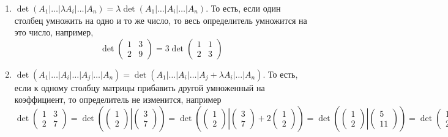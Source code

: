 \documentclass{article}
\begin{document}
\begin{enumerate}
	\item $\det(A_1|\ldots|\lambda A_i|\ldots|A_n)  = \lambda \det(A_1|\ldots|A_i|\ldots|A_n) $. То есть, если один столбец умножить на одно и то же число, то весь определитель умножится на это число, например,
	\[
	\det
	\begin{pmatrix}
		{1}&{3}\\
		{2}&{9}
	\end{pmatrix}
	=
	3
	\det
	\begin{pmatrix}
		{1}&{1}\\
		{2}&{3}
	\end{pmatrix}
	\]
	
	\item $\det(A_1|\ldots|A_i|\ldots|A_j|\ldots|A_n) = \det(A_1|\ldots|A_i|\ldots|A_j + \lambda A_i|\ldots|A_n)$. То есть, если к одному столбцу матрицы прибавить другой умноженный на коэффициент, то определитель не изменится, например
	\[
	\det
	\begin{pmatrix}
		{1}&{3}\\
		{2}&{7}
	\end{pmatrix}
	=
	\det
	\left(\left.
	\begin{pmatrix}
		{1}\\{2}
	\end{pmatrix}
	\right|
	\begin{pmatrix}
		{3}\\{7}
	\end{pmatrix}
	\right)
	=
	\det
	\left(\left.
	\begin{pmatrix}
		{1}\\{2}
	\end{pmatrix}
	\right|
	\begin{pmatrix}
		{3}\\{7}
	\end{pmatrix}
	+
	2
	\begin{pmatrix}
		{1}\\{2}
	\end{pmatrix}
	\right)
	=
	\det
	\left(\left.
	\begin{pmatrix}
		{1}\\{2}
	\end{pmatrix}
	\right|
	\begin{pmatrix}
		{5}\\{11}
	\end{pmatrix}
	\right)
	=
	\det
	\begin{pmatrix}
		{1}&{5}\\
		{2}&{11}
	\end{pmatrix}
	\]
	

\end{enumerate}
\end{document}
